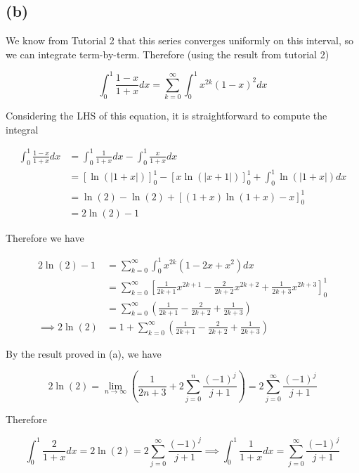 \documentclass{article}
\begin{document}
\subsection*{(b)}
We know from Tutorial 2 that this series converges uniformly on this interval, so we can integrate 
term-by-term. Therefore (using the result from tutorial 2)

\begin{equation*}
    \int_{0}^1 \frac{1-x}{1+x}dx = \sum_{k=0}^\infty \int_0^1 x^{2k}(1-x)^2 dx 
\end{equation*}

Considering the LHS of this equation, it is straightforward to compute the integral 

\begin{align*}
    \int_0^1 \frac{1-x}{1+x}dx &= \int_0^1 \frac{1}{1+x}dx - \int_0^1 \frac{x}{1+x}dx \\
    &= \left[\ln(|1+x|)\right]_0^1 - \left[x\ln(|x+1|)\right]_0^1 + \int_0^1 \ln(|1+x|)dx \\
    &= \ln(2) - \ln(2) + \left[(1+x)\ln(1+x) - x\right]_0^1 \\
    &= 2\ln(2) - 1
\end{align*}

Therefore we have 

\begin{align*}
    2\ln(2) - 1 &= \sum_{k=0}^\infty \int_0^1 x^{2k}(1-2x + x^2)dx \\
    &= \sum_{k=0}^\infty \left[\frac{1}{2k+1}x^{2k+1} - \frac{2}{2k+2}x^{2k+2} + \frac{1}{2k+3}x^{2k+3}\right]_0^1 \\
    &= \sum_{k=0}^\infty\left(\frac{1}{2k+1} - \frac{2}{2k+2} + \frac{1}{2k+3}\right) \\
    \implies 2\ln(2) &= 1+\sum_{k=0}^\infty\left(\frac{1}{2k+1} - \frac{2}{2k+2} + \frac{1}{2k+3}\right)
\end{align*}

By the result proved in (a), we have 

\begin{equation*}
    2\ln(2) = \lim_{n\rightarrow\infty} \left(\frac{1}{2n+3} + 2\sum_{j=0}^{n}\frac{(-1)^j}{j+1}\right) = 2\sum_{j=0}^\infty \frac{(-1)^j}{j+1}
\end{equation*}

Therefore 

\begin{equation*}
    \int_0^1\frac{2}{1+x}dx = 2\ln(2) = 2\sum_{j=0}^\infty \frac{(-1)^j}{j+1} \implies \int_0^1\frac{1}{1+x}dx = \sum_{j=0}^\infty \frac{(-1)^j}{j+1}
\end{equation*}
\end{document}
